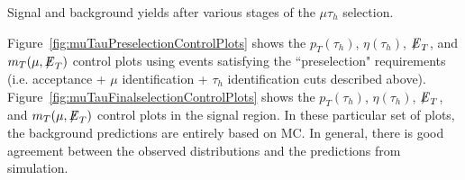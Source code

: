 \begin{table}[ht]
\begin{center}
  \caption{Signal and background yields after various stages of the $\mu\tau_{h}$ selection.}
  \label{tab:muTauCutFlowEff}
  \end{center}
\end{table}

Figure~\ref{fig:muTauPreselectionControlPlots} shows the $p_{T}(\tau_{h})$, $\eta(\tau_{h})$, ${\not\mathrel{E}}_T$, and $m_{T}(\mu,{\not\mathrel{E}}_T)$ control plots using events satisfying 
the ``preselection" requirements (i.e. acceptance + $\mu$ identification + $\tau_{h}$ identification cuts described above). 
Figure~\ref{fig:muTauFinalselectionControlPlots} shows the $p_{T}(\tau_{h})$, $\eta(\tau_{h})$, ${\not\mathrel{E}}_T$, and $m_{T}(\mu,{\not\mathrel{E}}_T)$ control plots in the signal region. 
In these particular set of plots, the background predictions are entirely based on MC. In general, there is good agreement between the observed distributions and the 
predictions from simulation.

